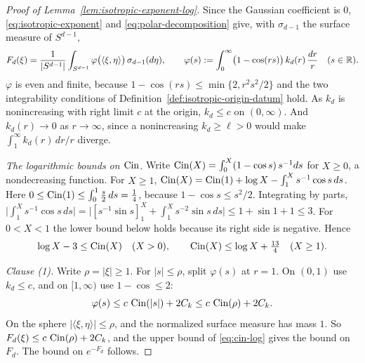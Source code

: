 \begin{proof}[Proof of Lemma~\ref{lem:isotropic-exponent-log}]
Since the Gaussian coefficient is $0$, \ref{eq:isotropic-exponent} and \ref{eq:polar-decomposition}
give, with $\sigma_{d-1}$ the surface measure of $S^{d-1}$,
\[
  F_d(\xi) = \frac{1}{|S^{d-1}|}\int_{S^{d-1}}\varphi\bigl(\langle\xi,\eta\rangle\bigr)\,\sigma_{d-1}(d\eta),
  \qquad
  \varphi(s) := \int_0^\infty\bigl(1 - \cos(rs)\bigr)\,k_d(r)\,\frac{dr}{r} \quad (s \in \mathbb{R}).
\]
$\varphi$ is even and finite, because $1 - \cos(rs) \le \min\{2, r^2s^2/2\}$ and the two
integrability conditions of Definition~\ref{def:isotropic-origin-datum} hold. As $k_d$ is nonincreasing with
right limit $c$ at the origin, $k_d \le c$ on $(0,\infty)$. And $k_d(r) \to 0$ as $r \to \infty$,
since a nonincreasing $k_d \ge \ell > 0$ would make $\int_1^\infty k_d(r)\,dr/r$ diverge.

\emph{The logarithmic bounds on $\operatorname{Cin}$.} Write $\operatorname{Cin}(X) = \int_0^X(1-\cos s)\,s^{-1}ds$ for
$X \ge 0$, a nondecreasing function. For $X \ge 1$,
$\operatorname{Cin}(X) = \operatorname{Cin}(1) + \log X - \int_1^X s^{-1}\cos s\,ds$. Here $0 \le \operatorname{Cin}(1) \le \int_0^1 \tfrac s2\,ds
= \tfrac14$, because $1 - \cos s \le s^2/2$. Integrating by parts,
$\bigl|\int_1^X s^{-1}\cos s\,ds\bigr| = \bigl|[s^{-1}\sin s]_1^X + \int_1^X s^{-2}\sin s\,ds\bigr|
\le 1 + \sin 1 + 1 \le 3$. For $0 < X < 1$ the lower bound below holds because its right side is
negative. Hence
\begin{equation}\label{eq:cin-log}
  \log X - 3 \le \operatorname{Cin}(X) \quad (X > 0),
  \qquad
  \operatorname{Cin}(X) \le \log X + \tfrac{13}{4} \quad (X \ge 1).
\end{equation}

\emph{Clause (1).} Write $\rho = |\xi| \ge 1$. For $|s| \le \rho$, split $\varphi(s)$ at $r = 1$.
On $(0,1)$ use $k_d \le c$, and on $[1,\infty)$ use $1 - \cos \le 2$:
\[
  \varphi(s) \le c\,\operatorname{Cin}(|s|) + 2C_k \le c\,\operatorname{Cin}(\rho) + 2C_k .
\]
On the sphere $|\langle\xi,\eta\rangle| \le \rho$, and the normalized surface measure has mass $1$.
So $F_d(\xi) \le c\,\operatorname{Cin}(\rho) + 2C_k$, and the upper bound of \ref{eq:cin-log} gives the bound on
$F_d$. The bound on $e^{-F_d}$ follows.


\end{proof}
